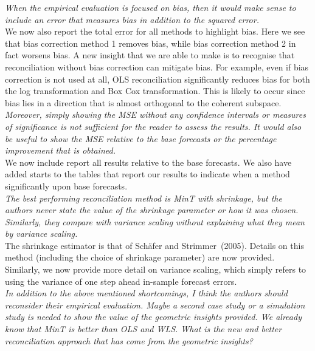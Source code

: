 \documentclass[a4paper,11pt]{article}
\begin{document}
\begin{enumerate}
		\textit{When the empirical evaluation is focused on bias, then it would make sense to include an error that measures bias in addition to the squared error.}\\
		
		We now also report the total error for all methods to highlight bias.  Here we see that bias correction method 1 removes bias, while bias correction method 2 in fact worsens bias.  A new insight that we are able to make is to recognise that reconciliation without bias correction can mitigate bias.  For example, even if bias correction is not used at all, OLS reconciliation significantly reduces bias for both the log transformation and Box Cox transformation.  This is likely to occur since bias lies in a direction that is almost orthogonal to the coherent subspace.\\
		
		\textit{Moreover, simply showing the MSE without any confidence intervals or measures of significance is not sufficient for the reader to assess the results.  It would also be useful to show the MSE relative to the base forecasts or the percentage improvement that is obtained.} \\
		
		We now include report all results relative to the base forecasts. We also have added starts to the tables that report our results to indicate when a method significantly upon base forecasts.\\
	
	    \textit{The best performing reconciliation method is MinT with shrinkage, but the authors never state	the value of the shrinkage parameter or how it was chosen.  Similarly, they compare with variance scaling without explaining what they mean by variance scaling.}\\
	    
	    The shrinkage estimator is that of Sch\"afer and Strimmer~(2005). Details on this method (including the choice of shrinkage parameter) are now provided.  Similarly, we now provide more detail on variance scaling, which simply refers to using the variance of one step ahead in-sample forecast errors.\\
	    
	    \textit{In addition to the above mentioned shortcomings, I think the authors should reconsider their empirical evaluation. Maybe a second case study or a simulation study is needed to show the value of the geometric insights provided. We already know that MinT is better than OLS and WLS. What is the new and better reconciliation approach that has come from the geometric insights?}\\	
		

\end{enumerate}
\end{document}
